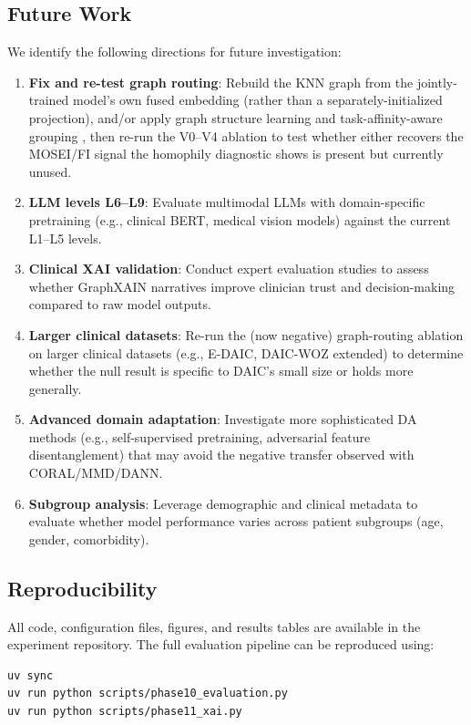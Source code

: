 \documentclass[12pt,oneside]{book}
\begin{document}
\subsection{Future Work}

We identify the following directions for future investigation:
\begin{enumerate}
    \item \textbf{Fix and re-test graph routing}: Rebuild the KNN graph from the jointly-trained model's own fused embedding (rather than a separately-initialized projection), and/or apply graph structure learning \citep{attali2026graphrewiring} and task-affinity-aware grouping \citep{li2023boosting}, then re-run the V0--V4 ablation to test whether either recovers the MOSEI/FI signal the homophily diagnostic shows is present but currently unused.
    \item \textbf{LLM levels L6--L9}: Evaluate multimodal LLMs with domain-specific pretraining (e.g., clinical BERT, medical vision models) against the current L1--L5 levels.
    \item \textbf{Clinical XAI validation}: Conduct expert evaluation studies to assess whether GraphXAIN narratives improve clinician trust and decision-making compared to raw model outputs.
    \item \textbf{Larger clinical datasets}: Re-run the (now negative) graph-routing ablation on larger clinical datasets (e.g., E-DAIC, DAIC-WOZ extended) to determine whether the null result is specific to DAIC's small size or holds more generally.
    \item \textbf{Advanced domain adaptation}: Investigate more sophisticated DA methods (e.g., self-supervised pretraining, adversarial feature disentanglement) that may avoid the negative transfer observed with CORAL/MMD/DANN.
    \item \textbf{Subgroup analysis}: Leverage demographic and clinical metadata to evaluate whether model performance varies across patient subgroups (age, gender, comorbidity).
\end{enumerate}

\subsection{Reproducibility}

All code, configuration files, figures, and results tables are available in the experiment repository. The full evaluation pipeline can be reproduced using:
\begin{verbatim}
uv sync
uv run python scripts/phase10_evaluation.py
uv run python scripts/phase11_xai.py
\end{verbatim}
\end{document}

